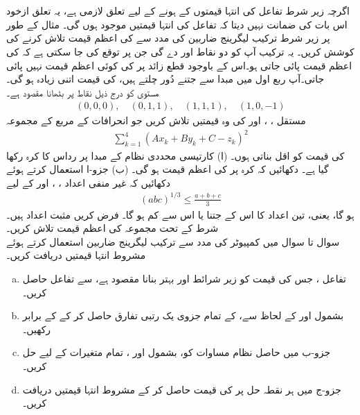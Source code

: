 \\
\\
اگرچہ زیر  شرط  تفاعل   کی انتہا  قیمتوں کے ہونے کے  لیے  تعلق  لازمی ہے،  یہ تعلق  ازخود  اس بات کی ضمانت نہیں دیتا کہ   تفاعل کی انتہا قیمتیں موجود ہوں گی۔ مثال کے طور پر زیر شرط  ترکیب لیگرینج  ضاربین کی مدد سے  کی اعظم قیمت تلاش کرنے کی کوشش کریں۔ یہ ترکیب آپ کو دو نقاط  اور  دے  گی جن پر توقع کی جا سکتی ہے کہ  کی اعظم قیمت پائی جاتی ہو۔اس کے باوجود قطع زائد   پر  کی کوئی  اعظم قیمت نہیں پائی جاتی۔آپ ربع اول میں مبدا سے جتنے دُور چلتے ہیں،  کی قیمت اتنی زیادہ ہو گی۔
\\
مستوی  کو درج ذیل نقاط  پر بٹھانا مقصود ہے۔ 
\begin{align*}
(0,0,0),\quad (0,1,1),\quad (1,1,1),\quad (1,0,-1)
\end{align*}
مستقل ،  ، اور  کی وہ قیمتیں تلاش کریں جو  انحرافات  کے  مربع کے مجموعہ
\begin{align*}
\sum_{k=1}^4 (Ax_k+By_k+C-z_k)^2
\end{align*}
کی قیمت کو اقل  بناتی ہوں۔
(ا) کارتیسی محددی  نظام کے مبدا پر  رداس  کا کرہ رکھا گیا ہے۔ دکھائیں کہ  کرہ پر  کی اعظم قیمت  ہو گی۔  (ب) جزو-ا استعمال کرتے ہوئے دکھائیں کہ غیر منفی اعداد ،  ، اور  کے لیے
\begin{align*}
(abc)^{1/3}\le \frac{a+b+c}{3}
\end{align*}
ہو گا، یعنی،  تین اعداد کا  اس کے    جتنا یا اس سے کم ہو گا۔
فرض کریں  مثبت  اعداد ہیں۔ شرط    کے تحت مجموعہ   کی اعظم قیمت تلاش کریں۔
\\
سوال  تا سوال  میں کمپیوٹر کی مدد سے  ترکیب لیگرینج ضاربین استعمال کرتے ہوئے   مشروط انتہا   قیمتیں دریافت کریں۔
\begin{enumerate}[a.]
\item
تفاعل ،  جس کی قیمت کو زیر شرائط  اور  بہتر بنانا مقصود ہے، سے تفاعل  حاصل کریں۔
\item
 بشمول  اور  کے لحاظ سے،  کے تمام جزوی یک رتبی تفارق حاصل کر کے  کے برابر رکھیں۔
\item
جزو-ب میں حاصل نظام مساوات کو،  بشمول  اور ،  تمام متغیرات کے لیے حل کریں۔
\item
جزو-ج میں ہر نقطہ حل پر  کی قیمت حاصل کر کے مشروط انتہا قیمتیں دریافت کریں۔
\end{enumerate}


